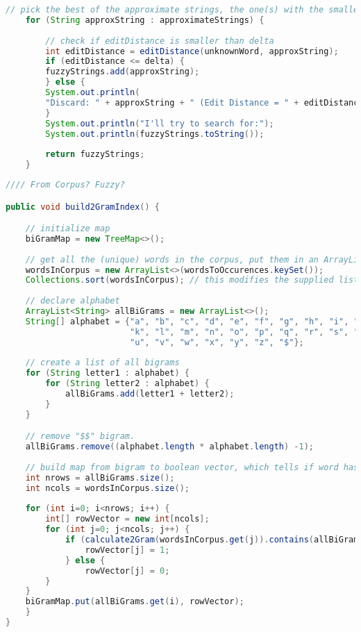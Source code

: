 \begin{lstlisting}[language=Java, caption=This is a code example., label=lst:2-gram]
	// pick the best of the approximate strings, the one(s) with the smallest edit distance.
	for (String approxString : approximateStrings) {
	
		// check if editDistance is smaller than delta
		int editDistance = editDistance(unknownWord, approxString);
		if (editDistance <= delta) {
		fuzzyStrings.add(approxString);
		} else {
		System.out.println(
		"Discard: " + approxString + " (Edit Distance = " + editDistance + " > " + delta + ")");
		}
		System.out.println("I'll try to search for:");
		System.out.println(fuzzyStrings.toString());
		
		return fuzzyStrings;
	}
\end{lstlisting}



\begin{lstlisting}[language=Java, caption=This is a code example., label=lst:2-gram]
//// From Corpus? Fuzzy?

public void build2GramIndex() {

	// initialize map
	biGramMap = new TreeMap<>();
	
	// get all the (unique) words in the corpus, put them in an ArrayList and sort them alphabetically.
	wordsInCorpus = new ArrayList<>(wordsToOccurences.keySet()); 
	Collections.sort(wordsInCorpus); // this modifies the supplied list
	
	// declare alphabet
	ArrayList<String> allBiGrams = new ArrayList<>();
	String[] alphabet = {"a", "b", "c", "d", "e", "f", "g", "h", "i", "j",
						 "k", "l", "m", "n", "o", "p", "q", "r", "s", "t",
						 "u", "v", "w", "x", "y", "z", "$"};
	
	// create a list of all bigrams
	for (String letter1 : alphabet) {
		for (String letter2 : alphabet) {
			allBiGrams.add(letter1 + letter2);
		}
	}

	// remove "$$" bigram.
	allBiGrams.remove((alphabet.length * alphabet.length) -1);
	
	// build map from bigram to boolean vector, which tells if word has bigram or not.
	int nrows = allBiGrams.size();
	int ncols = wordsInCorpus.size();
	
	for (int i=0; i<nrows; i++) {
		int[] rowVector = new int[ncols];
		for (int j=0; j<ncols; j++) {
			if (calculate2Gram(wordsInCorpus.get(j)).contains(allBiGrams.get(i))) { // inefficient calculates grams to many times. But luckily the map is build only once
				rowVector[j] = 1;
			} else {
				rowVector[j] = 0;
		}
	}
	biGramMap.put(allBiGrams.get(i), rowVector);
	}	
}
\end{lstlisting}


